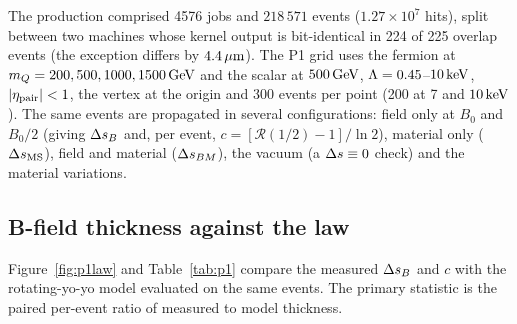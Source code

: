 The production comprised 4576 jobs and $218\,571$ events ($1.27\times10^7$ hits), split between two machines whose
kernel output is bit-identical in 224 of 225 overlap events (the exception differs by $4.4\,\mu\mathrm{m}$). The P1 grid uses the
fermion at $m_Q=200,500,1000,1500\,\mathrm{GeV}$ and the scalar at $500\,\mathrm{GeV}$, $\Lambda=0.45$--$10\,\mathrm{keV}$, $|\eta_{\rm pair}|<1$, the
vertex at the origin and 300 events per point (200 at 7 and $10\,\mathrm{keV}$). The same events are propagated in several
configurations: field only at $B_0$ and $B_0/2$ (giving $\Delta s_B$ and, per event, $c=[\mathcal R(1/2)-1]/\ln2$), material only
($\Delta s_{\rm MS}$), field and material ($\Delta s_{BM}$), the vacuum (a $\Delta s\equiv0$ check) and the material variations.

\subsection{B-field thickness against the law}\label{sec:p1:law}
Figure~\ref{fig:p1law} and Table~\ref{tab:p1} compare the measured $\Delta s_B$ and $c$ with the rotating-yo-yo model
evaluated on the same events. The primary statistic is the paired per-event ratio of measured to model thickness.
